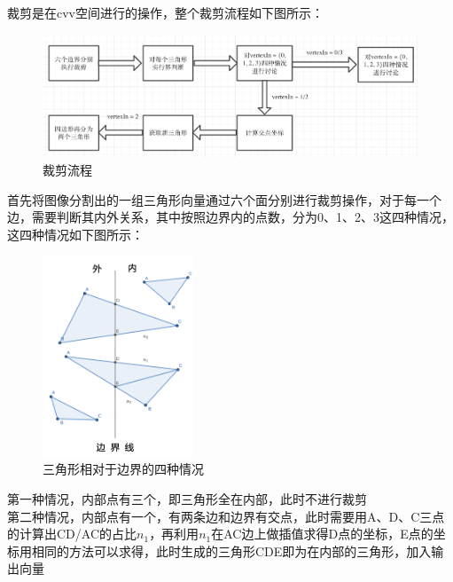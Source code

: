     \begin{spacing}{2.5}
 	裁剪是在cvv空间进行的操作，整个裁剪流程如下图所示：
    	\begin{figure}[H]
		\centering
		\includegraphics[width=1.0\textwidth]{images/clip1.png}
		\caption{裁剪流程}
		\label{line}
	\end{figure}
	首先将图像分割出的一组三角形向量通过六个面分别进行裁剪操作，对于每一个边，需要判断其内外关系，其中按照边界内的点数，分为0、1、2、3这四种情况，这四种情况如下图所示：
	    	\begin{figure}[H]
		\centering
		\includegraphics[width=0.4\textwidth]{images/clip2.png}
		\caption{三角形相对于边界的四种情况}
		\label{line}
	\end{figure}
	
第一种情况，内部点有三个，即三角形全在内部，此时不进行裁剪\\

第二种情况，内部点有一个，有两条边和边界有交点，此时需要用A、D、C三点的计算出CD/AC的占比$n_1$，再利用$n_1$在AC边上做插值求得D点的坐标，E点的坐标用相同的方法可以求得，此时生成的三角形CDE即为在内部的三角形，加入输出向量\\
    \end{spacing}

